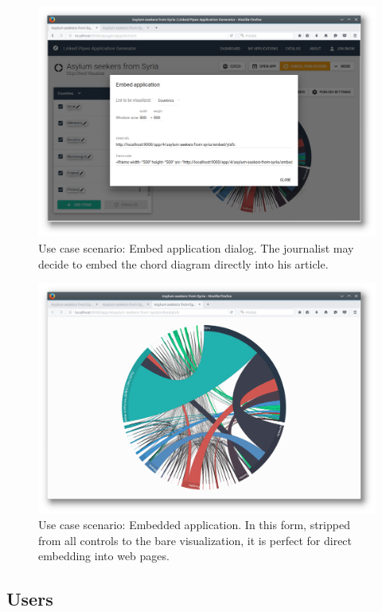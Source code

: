 \begin{figure}
	\centering
	\includegraphics[width=145mm]{img/05_scenario_10_embed_application}
	\caption{Use case scenario: Embed application dialog. The journalist may decide to embed the chord diagram directly into his article.}
    \label{fig:scenario-10-embed-application}
\end{figure}

\begin{figure}
	\centering
	\includegraphics[width=145mm]{img/05_scenario_11_embedded_application}
	\caption{Use case scenario: Embedded application. In this form, stripped from all controls to the bare visualization, it is perfect for direct embedding into web pages.}
    \label{fig:scenario-11-embedded-application}
\end{figure}


\subsection{Users}
\label{sec:implementation:overview:users}

